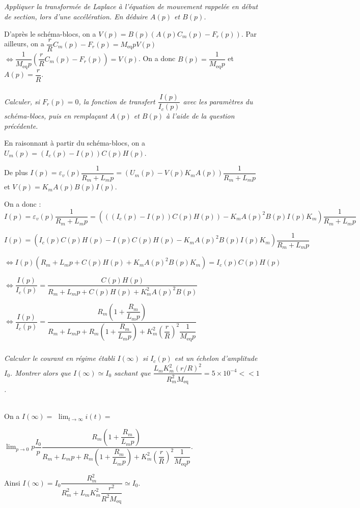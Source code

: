 \documentclass[10pt,fleqn]{article} %
\begin{document}
\subparagraph{}
\textit{Appliquer la transformée de Laplace à l’équation de mouvement rappelée en début de section, lors d’une accélération. En déduire $A(p)$ et $B(p)$.}
\ifprof
\begin{corrige}
D'après le schéma-blocs, on a $V(p)=B(p)\left(A(p)C_m(p)-F_r(p) \right)$. Par ailleurs, 
on a $\dfrac{r}{R}C_m(p)-F_r(p)=M_{\text{eq}} pV(p)$ $ \Leftrightarrow  \dfrac{1}{M_{\text{eq}} p} \left(\dfrac{r}{R}C_m(p)- F_r(p)\right)=V(p)$. On a donc $B(p)=\dfrac{1}{M_{\text{eq}} p}$ et $A(p)=\dfrac{r}{R}$.
\end{corrige}
\else
\fi


\subparagraph{}
\textit{Calculer, si $F_r(p) = 0$, la fonction de transfert $\dfrac{I(p)}{I_c(p)}$ avec les paramètres du schéma-blocs, puis en remplaçant $A(p)$ et $B(p)$ à l’aide de la question précédente.}
\ifprof
\begin{corrige}
En raisonnant à partir du schéma-blocs, on a $U_m(p)=\left(I_c(p)-I(p)\right)C(p)H(p)$. 

De plus $I(p)=\varepsilon_v(p)\dfrac{1}{R_m + L_m p}=\left(U_m(p)-V(p) K_m A(p) \right)\dfrac{1}{R_m + L_m p}$ et $V(p)=K_m A(p) B(p) I(p)$. 

On a donc : 
$I(p)=\varepsilon_v(p)\dfrac{1}{R_m + L_m p}=\left(\left(\left(I_c(p)-I(p)\right)C(p)H(p) \right)-K_m A(p)^2B(p) I(p) K_m  \right)\dfrac{1}{R_m + L_m p}$


$I(p)=\left(I_c(p)C(p)H(p)-I(p)C(p)H(p) -K_m A(p)^2B(p) I(p) K_m  \right)\dfrac{1}{R_m + L_m p}$


$\Leftrightarrow I(p)\left( R_m + L_m p+C(p)H(p)+K_m A(p)^2B(p) K_m\right)=I_c(p)C(p)H(p) $

$\Leftrightarrow \dfrac{I(p)}{I_c(p)}=\dfrac{C(p)H(p)}{ R_m + L_m p+C(p)H(p)+K_m^2 A(p)^2B(p) }$

$\Leftrightarrow \dfrac{I(p)}{I_c(p)}=\dfrac{ R_m\left( 1+\dfrac{R_m}{L_m p}\right)}{ R_m + L_m p+ R_m\left( 1+\dfrac{R_m}{L_m p}\right) +K_m^2 \left(\dfrac{r}{R}\right)^2 \dfrac{1}{M_{\text{eq}} p}   }$
\end{corrige}
\else
\fi


\subparagraph{}
\textit{Calculer le courant en régime établi $I(\infty)$ si $I_c(p)$ est un échelon d’amplitude $I_0$. Montrer alors que $I(\infty) \simeq I_0$ sachant que $\dfrac{L_mK_m^2\left(r/R\right)^2}{R_m^2 M_{\text{eq}}}=5\times 10^{-4} << 1$.}
\ifprof
\begin{corrige} ~\\

On a $I(\infty) =$ $ \lim_{t\to\infty} i(t)=$ 

$ \lim_{p\to 0 } p \dfrac{I_0}{p} \dfrac{ R_m\left( 1+\dfrac{R_m}{L_m p}\right)}{ R_m + L_m p+ R_m\left( 1+\dfrac{R_m}{L_m p}\right) +K_m^2 \left(\dfrac{r}{R}\right)^2 \dfrac{1}{M_{\text{eq}} p}   }$. 

Ainsi $I(\infty) =I_0 \dfrac{ R_m^2}{   R_m^2 + L_m K_m^2 \dfrac{r^2}{R^2M_{\text{eq}}}    } \simeq I_0$.
\end{corrige}
\else
\fi
\end{document}
